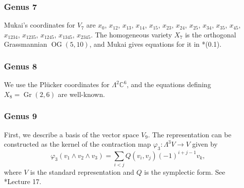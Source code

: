 \documentclass{amsart}[12pt]
\theoremstyle{definition}
\numberwithin{equation}{section}
\newcommand{\OG}{\operatorname{OG}(5,10)}
\newcommand{\Gr}{\operatorname{Gr}}
\newcommand{\mywedge}{\mathsf{\Lambda}}
\begin{document}
\subsubsection{Genus 7}
Mukai's coordinates for $V_7$ are $x_0$, $x_{12}$, $x_{13}$,
$x_{14}$, $x_{15}$, $x_{23}$, $x_{24}$, $x_{25}$, $x_{34}$, $x_{35}$, $x_{45}$,
$x_{1234}$, $x_{1235}$, $x_{1245}$, $x_{1345}$, $x_{2345}$. The homogeneous variety $X_7$ is the orthogonal Grassmannian
$\OG$, and Mukai gives equations for it in \cite{Mukai1995}*{(0.1)}.

\subsubsection{Genus 8} We use the Pl\"{u}cker coordinates
for $\mywedge^2 \mathbb{C}^{6}$, and the equations defining $X_8 =
\Gr(2,6)$ are well-known. %

\subsubsection{Genus 9} \label{subsubsec: SpGr36}
First, we describe a basis of the vector space $V_9$.
The representation can be constructed as the kernel of the
  contraction map $\varphi_3: \mywedge^3 V \rightarrow V$
given by 
\[
\varphi_3(v_1 \wedge v_2 \wedge v_3) = \sum_{i < j} Q(v_i,v_j)
  (-1)^{i+j-1} v_k,
\]
where \(V\) is the standard representation and \(Q\) is the symplectic
  form. See \cite{FH}*{Lecture 17}.
\end{document}
